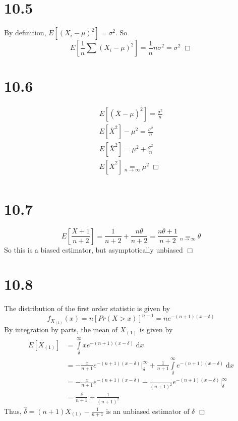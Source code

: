 \documentclass{article}
\begin{document}
\section*{10.5}
By definition, $E[(X_i-\mu)^2] = \sigma^2$. So
$$E[\frac{1}{n}\sum(X_i-\mu)^2] = \frac{1}{n}n\sigma^2 = \sigma^2 \; \Box$$

\section*{10.6}
\begin{gather*}
  E[(\overline{X}-\mu)^2] = \frac{\sigma^2}{n}\\
  E[\overline{X}^2] - \mu^2 = \frac{\sigma^2}{n}\\
  E[\overline{X}^2] = \mu^2 + \frac{\sigma^2}{n}\\
  E[\overline{X}^2] \underset{n \rightarrow \infty}{=} \mu^2 \; \Box\\
\end{gather*}

\section*{10.7}
$$E[\frac{X+1}{n+2}] = \frac{1}{n+2} + \frac{n\theta}{n+2} = \frac{n\theta + 1}{n+2} \underset{n \rightarrow \infty}{=} \theta$$
So this is a biased estimator, but asymptotically unbiased $\Box$

\section*{10.8}
The distribution of the first order statistic is given by
$$f_{X_{(1)}}(x) = n \left[Pr(X > x)\right]^{n-1} = ne^{-(n+1)(x-\delta)}$$
By integration by parts, the mean of $X_{(1)}$ is given by
\begin{equation*}
\begin{split}
  E[X_{(1)}] &= \int\limits_\delta^\infty xe^{-(n+1)(x-\delta)} \; \mathrm{d}x\\
  &= -\frac{x}{n+1}e^{-(n+1)(x-\delta)}\Big\rvert_\delta^\infty + \frac{1}{n+1}\int\limits_\delta^\infty e^{-(n+1)(x-\delta)} \; \mathrm{d}x\\
  &= -\frac{x}{n+1}e^{-(n+1)(x-\delta)} -\frac{}{(n+1)^2}e^{-(n+1)(x-\delta)}\Big\rvert_\delta^\infty\\
  &= \frac{\delta}{n+1} + \frac{1}{(n+1)^2}
\end{split}
\end{equation*}
Thus, $\hat{\delta} = (n+1)X_{(1)} - \frac{1}{n+1}$ is an unbiased estimator of $\delta$ $\Box$
\end{document}
